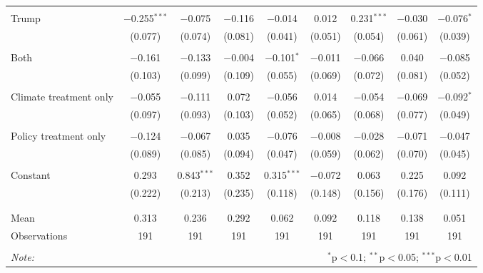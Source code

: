 \begin{tabular}{@{\extracolsep{5pt}}lcccccccc}
  & & & & & & & & \\ 
 Trump & $-$0.255$^{***}$ & $-$0.075 & $-$0.116 & $-$0.014 & 0.012 & 0.231$^{***}$ & $-$0.030 & $-$0.076$^{*}$ \\ 
  & (0.077) & (0.074) & (0.081) & (0.041) & (0.051) & (0.054) & (0.061) & (0.039) \\ 
  & & & & & & & & \\ 
 Both & $-$0.161 & $-$0.133 & $-$0.004 & $-$0.101$^{*}$ & $-$0.011 & $-$0.066 & 0.040 & $-$0.085 \\ 
  & (0.103) & (0.099) & (0.109) & (0.055) & (0.069) & (0.072) & (0.081) & (0.052) \\ 
  & & & & & & & & \\ 
 Climate treatment only & $-$0.055 & $-$0.111 & 0.072 & $-$0.056 & 0.014 & $-$0.054 & $-$0.069 & $-$0.092$^{*}$ \\ 
  & (0.097) & (0.093) & (0.103) & (0.052) & (0.065) & (0.068) & (0.077) & (0.049) \\ 
  & & & & & & & & \\ 
 Policy treatment only & $-$0.124 & $-$0.067 & 0.035 & $-$0.076 & $-$0.008 & $-$0.028 & $-$0.071 & $-$0.047 \\ 
  & (0.089) & (0.085) & (0.094) & (0.047) & (0.059) & (0.062) & (0.070) & (0.045) \\ 
  & & & & & & & & \\ 
 Constant & 0.293 & 0.843$^{***}$ & 0.352 & 0.315$^{***}$ & $-$0.072 & 0.063 & 0.225 & 0.092 \\ 
  & (0.222) & (0.213) & (0.235) & (0.118) & (0.148) & (0.156) & (0.176) & (0.111) \\ 
  & & & & & & & & \\ 
\hline \\[-1.8ex] 
Mean & 0.313 & 0.236 & 0.292 & 0.062 & 0.092 & 0.118 & 0.138 & 0.051 \\ 
Observations & 191 & 191 & 191 & 191 & 191 & 191 & 191 & 191 \\ 
\hline 
\hline \\[-1.8ex] 
\textit{Note:}  & \multicolumn{8}{r}{$^{*}$p$<$0.1; $^{**}$p$<$0.05; $^{***}$p$<$0.01} \\ 
\end{tabular} 
